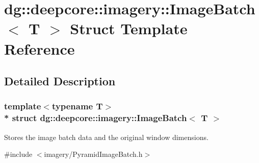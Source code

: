 \hypertarget{structdg_1_1deepcore_1_1imagery_1_1_image_batch}{}\section{dg\+:\+:deepcore\+:\+:imagery\+:\+:Image\+Batch$<$ T $>$ Struct Template Reference}
\label{structdg_1_1deepcore_1_1imagery_1_1_image_batch}


\subsection{Detailed Description}
\subsubsection*{template$<$typename T$>$\\*
struct dg\+::deepcore\+::imagery\+::\+Image\+Batch$<$ T $>$}

Stores the image batch data and the original window dimensions. 

{\ttfamily \#include $<$imagery/\+Pyramid\+Image\+Batch.\+h$>$}

